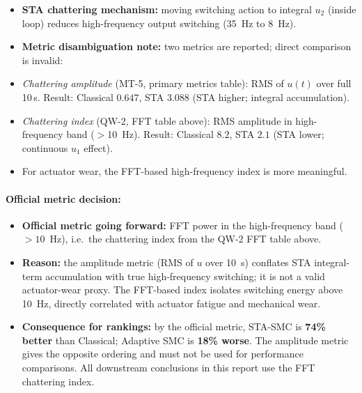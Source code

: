\documentclass[10pt, a4paper]{article}
\begin{document}
\begin{itemize}[leftmargin=1.5em,itemsep=0.2em]
  \item \textbf{STA chattering mechanism:} moving switching action to integral
  $u_2$ (inside loop) reduces high-frequency output switching (35~Hz to 8~Hz).
  \item \textbf{Metric disambiguation note:}
  two metrics are reported; direct comparison is invalid:
\end{itemize}
\begin{itemize}[noitemsep]
  \item \textit{Chattering amplitude} (MT-5, primary metrics table):
        RMS of $u(t)$ over full 10\,s.
        Result: Classical $0.647$, STA $3.088$ (STA higher; integral accumulation).
  \item \textit{Chattering index} (QW-2, FFT table above):
        RMS amplitude in high-frequency band ($>$10~Hz).
        Result: Classical $8.2$, STA $2.1$ (STA lower; continuous $u_1$ effect).
\end{itemize}
\begin{itemize}[leftmargin=1.5em,itemsep=0.2em]
  \item For actuator wear, the FFT-based high-frequency index is more meaningful.
\end{itemize}

\paragraph{Official metric decision:}
\begin{itemize}[leftmargin=1.5em,itemsep=0.2em]
  \item \textbf{Official metric going forward:} FFT power in the high-frequency
  band ($>10$~Hz), i.e.\ the chattering index from the QW-2 FFT table above.
  \item \textbf{Reason:} the amplitude metric (RMS of $u$ over 10~s) conflates
  STA integral-term accumulation with true high-frequency switching; it is not
  a valid actuator-wear proxy.  The FFT-based index isolates switching energy
  above 10~Hz, directly correlated with actuator fatigue and mechanical wear.
  \item \textbf{Consequence for rankings:} by the official metric, STA-SMC is
  \textbf{74\% better} than Classical; Adaptive SMC is \textbf{18\% worse}.
  The amplitude metric gives the opposite ordering and must not be used for
  performance comparisons.  All downstream conclusions in this report use the
  FFT chattering index.
\end{itemize}
\end{document}
